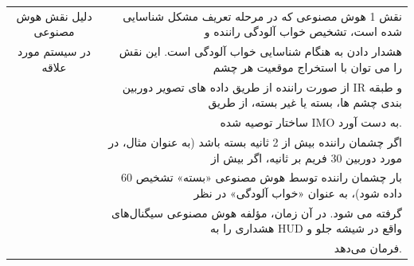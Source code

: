 \documentclass[a4paper,10pt]{article}
\begin{document}
\begin{table}[htbp]
\begin{tabularx}{\textwidth}{c c c c X}
                    \multicolumn{2}{c}{دلیل نقش هوش مصنوعی} & \multicolumn{3}{r}{نقش 1 هوش مصنوعی که در مرحله تعریف مشکل شناسایی شده است، تشخیص خواب آلودگی راننده و} \\
                    \multicolumn{2}{c}{در سیستم مورد علاقه} & \multicolumn{3}{r}{هشدار دادن به هنگام شناسایی خواب آلودگی است. این نقش را می توان با استخراج موقعیت هر چشم} \\
                    \multicolumn{2}{c}{} & \multicolumn{3}{r}{از صورت راننده از طریق داده های تصویر دوربین IR و طبقه بندی چشم ها، بسته یا غیر بسته، از طریق} \\
                    \multicolumn{2}{c}{} & \multicolumn{3}{r}{ساختار توصیه شده IMO به دست آورد.} \\
                    \multicolumn{2}{c}{} & \multicolumn{3}{r}{اگر چشمان راننده بیش از 2 ثانیه بسته باشد (به عنوان مثال، در مورد دوربین 30 فریم بر ثانیه، اگر بیش از} \\
                    \multicolumn{2}{c}{} & \multicolumn{3}{r}{60 بار چشمان راننده توسط هوش مصنوعی «بسته» تشخیص داده شود)، به عنوان «خواب آلودگی» در نظر} \\
                    \multicolumn{2}{c}{} & \multicolumn{3}{r}{گرفته می شود. در آن زمان، مؤلفه هوش مصنوعی سیگنال‌های هشداری را به HUD واقع در شیشه جلو و} \\
                    \multicolumn{2}{c}{} & \multicolumn{3}{r}{فرمان می‌دهد.} \\

                    \hline

                \end{tabularx}
                
            \end{table}
\end{document}
